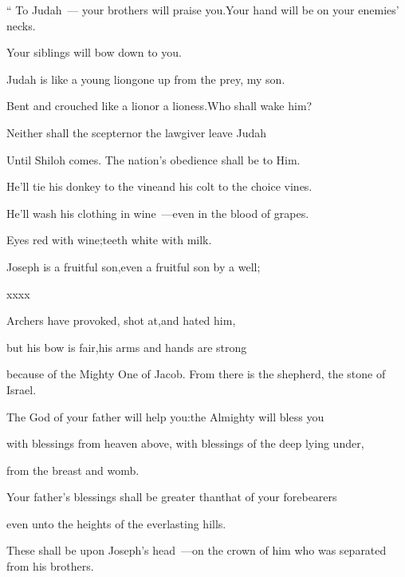 
\begin{inparaenum}
   ``%
  \pb {} To Judah~--- your brothers will praise you.\pa Your hand will be on your enemies' necks.%
  
  \pa Your siblings will bow down to you.%
  
  \pa {} Judah is like a young lion\pa gone up from the prey, my son.%
  
  \pa Bent and crouched like a lion\pa or a lioness.\pa Who shall wake him?%
  
  \pa {} Neither shall the scepter\pa nor the lawgiver leave Judah%
  
  \pa Until Shiloh comes. The nation's obedience shall be to Him.%
  
  \pa {} He'll tie his donkey to the vine\pa and his colt to the choice vines.%
  
  \pa He'll wash his clothing in wine~---\pa even in the blood of grapes.%
  
  \pa {} Eyes red with wine;\pa teeth white with milk.%
  
  \pb {} Joseph is a fruitful son,\pa even a fruitful son by a well;%
  
  \pa xxxx%
  
  \pa {} Archers have provoked, shot at,\pa and hated him,%
  
  \pa {} but his bow is fair,\pa his arms and hands are strong%
  
  \pa because of the Mighty One of Jacob. From there is the shepherd, the stone of Israel.%
  
  \pa {} The God of your father will help you:\pa the Almighty will bless you%
  
  \pa with blessings from heaven above, with blessings of the deep lying under,%
  
  \pa from the breast and womb.%
  
  \pa {} Your father's blessings shall be greater than\pa that of your forebearers%
  
  \pa even unto the heights of the everlasting hills.%
  
  \pa These shall be upon Joseph's head~---\pa on the crown of him who was separated from his brothers.%
  
\end{inparaenum}
